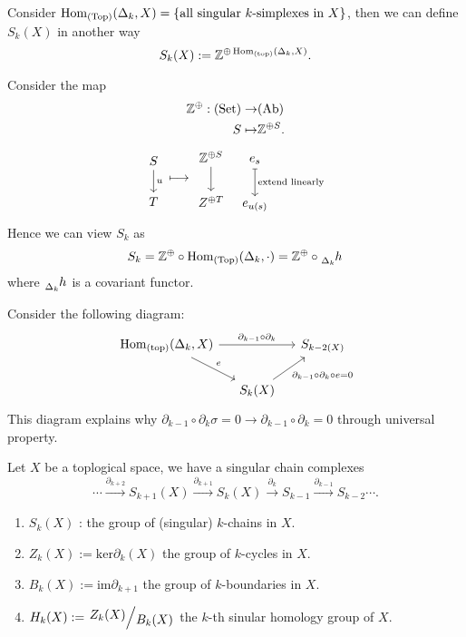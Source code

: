 \begin{example}
  Consider $\operatorname{Hom}_{(\text{Top})}(\Delta_k,X) = \left\{ \text{all singular }k\text{-simplexes in }X\right\}  $, then we can define $S_k(X)$ in another way 
  \[
    S_k(X):= \mathbb{Z}^{\oplus \operatorname{Hom}_{(\text{top})}(\Delta_k,X)}.
  \] 
\end{example}
Consider the map 
\begin{align*}
  \mathbb{Z}^{\oplus}: (\text{Set})\to & (\text{Ab})\\
  S\mapsto & \mathbb{Z}^{\oplus S}
.\end{align*}
\[
\begin{tikzcd}
  S \arrow[d,"u"]\\
  T 
\end{tikzcd}\longmapsto 
\begin{tikzcd}[column sep = tiny]
  \Z^{\oplus S}\arrow[d] & e_s \arrow[d,mapsto,"\text{extend linearly}"]\\
  Z^{\oplus T} & e_{u(s)}
\end{tikzcd}
\]
Hence we can view $S_k$ as
\[
  S_k= \Z^{\oplus}\circ \Hom_{(\mathrm{Top})}(\Delta_k,\cdot )=\Z^{\oplus}\circ\tensor[_{\Delta_k}]{h}{}
\]
where $\tensor[_{\Delta_k}]{h}{} $ is a covariant functor.

Consider the following diagram:
\[
  \begin{tikzcd}[column sep=small]
  \Hom_{(\mathrm{top})}(\Delta_k,X) \arrow{rr}{\partial_{k-1}\circ \partial_k}\arrow{rd}{e} 		 & & S_{k-2(X)}\\
  &S_k(X) \arrow{ru}[swap]{\partial_{k-1}\circ\partial_k \circ e =0}& 
\end{tikzcd}
\] 
This diagram explains why $\partial_{k-1}\circ\partial_{k}\sigma=0\to \partial_{k-1}\circ\partial_{k}=0$ through universal property.

\begin{definition}
  Let $X$ be a toplogical space, we have a singular chain complexes
  \[ 
  \cdots\xrightarrow{\partial_{k+2}}S_{k+1}(X)\xrightarrow{\partial_{k+1}} S_{k}(X)\xrightarrow{\partial_k} S_{k-1}\xrightarrow{\partial_{k-1}}S_{k-2}\cdots.
  \] 
  \begin{enumerate}
    \item $S_k(X)$ : the group of (singular) $k$-chains in $X$.
    \item  $Z_k(X):=\mathrm{ker}\partial_k(X)$ the group of $k$-cycles in $X$.
    \item $B_k(X):= \mathrm{im}\partial_{k+1}$ the group of $k$-boundaries in $X$. 
    \item $H_k(X):= \sfrac{Z_k(X)}{B_k(X)}$ the $k$-th sinular homology group of $X$.
  \end{enumerate}

\end{definition}

